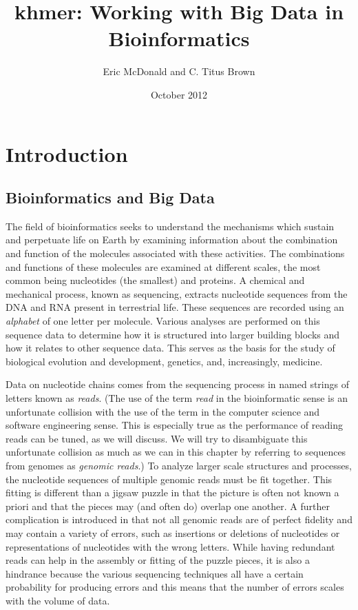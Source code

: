 \documentclass{article}
\title{khmer: Working with Big Data in Bioinformatics}
\author{Eric McDonald and C. Titus Brown}
\date{October 2012}
\begin{document}
\maketitle

\section{Introduction}

\subsection{Bioinformatics and Big Data}

The field of bioinformatics seeks to understand the mechanisms which sustain and perpetuate life on Earth by examining information about the combination and function of the molecules associated with these activities. The combinations and functions of these molecules are examined at different scales, the most common being nucleotides (the smallest) and proteins. A chemical and mechanical process, known as sequencing, extracts nucleotide sequences from the DNA and RNA present in terrestrial life. These sequences are recorded using an \textit{alphabet} of one letter per molecule. Various analyses are performed on this sequence data to determine how it is structured into larger building blocks and how it relates to other sequence data. This serves as the basis for the study of biological evolution and development, genetics, and, increasingly, medicine.

Data on nucleotide chains comes from the sequencing process in named strings of letters known as \textit{reads}. (The use of the term \textit{read} in the bioinformatic sense is an unfortunate collision with the use of the term in the computer science and software engineering sense. This is especially true as the performance of reading reads can be tuned, as we will discuss. We will try to disambiguate this unfortunate collision as much as we can in this chapter by referring to sequences from genomes as \textit{genomic reads}.) To analyze larger scale structures and processes, the nucleotide sequences of multiple genomic reads must be fit together. This fitting is different than a jigsaw puzzle in that the picture is often not known a priori and that the pieces may (and often do) overlap one another. A further complication is introduced in that not all genomic reads are of perfect fidelity and may contain a variety of errors, such as insertions or deletions of nucleotides or representations of nucleotides with the wrong letters. While having redundant reads can help in the assembly or fitting of the puzzle pieces, it is also a hindrance because the various sequencing techniques all have a certain probability for producing errors and this means that the number of errors scales with the volume of data.
\end{document}
